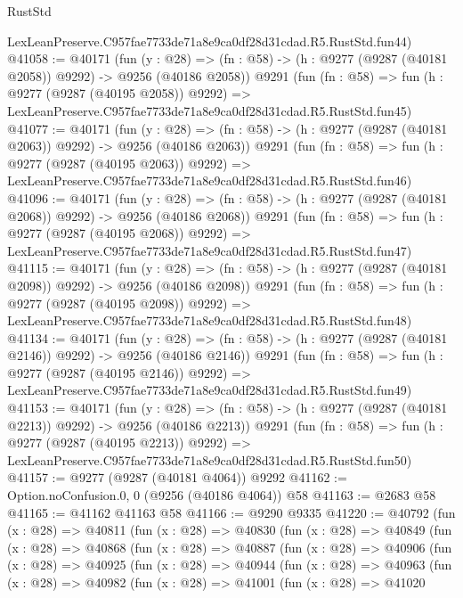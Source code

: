 \begin{lexlean}{RustStd}
\begin{coremodule}
    LexLeanPreserve.C957fae7733de71a8e9ca0df28d31cdad.R5.RustStd.fun44)
@41058 := @40171
    (fun (y : @28) =>
    (fn : @58) -> (h : @9277 (@9287 (@40181 @2058)) @9292) -> @9256 (@40186 @2058))
    @9291
    (fun (fn : @58) =>
    fun (h : @9277 (@9287 (@40195 @2058)) @9292) =>
    LexLeanPreserve.C957fae7733de71a8e9ca0df28d31cdad.R5.RustStd.fun45)
@41077 := @40171
    (fun (y : @28) =>
    (fn : @58) -> (h : @9277 (@9287 (@40181 @2063)) @9292) -> @9256 (@40186 @2063))
    @9291
    (fun (fn : @58) =>
    fun (h : @9277 (@9287 (@40195 @2063)) @9292) =>
    LexLeanPreserve.C957fae7733de71a8e9ca0df28d31cdad.R5.RustStd.fun46)
@41096 := @40171
    (fun (y : @28) =>
    (fn : @58) -> (h : @9277 (@9287 (@40181 @2068)) @9292) -> @9256 (@40186 @2068))
    @9291
    (fun (fn : @58) =>
    fun (h : @9277 (@9287 (@40195 @2068)) @9292) =>
    LexLeanPreserve.C957fae7733de71a8e9ca0df28d31cdad.R5.RustStd.fun47)
@41115 := @40171
    (fun (y : @28) =>
    (fn : @58) -> (h : @9277 (@9287 (@40181 @2098)) @9292) -> @9256 (@40186 @2098))
    @9291
    (fun (fn : @58) =>
    fun (h : @9277 (@9287 (@40195 @2098)) @9292) =>
    LexLeanPreserve.C957fae7733de71a8e9ca0df28d31cdad.R5.RustStd.fun48)
@41134 := @40171
    (fun (y : @28) =>
    (fn : @58) -> (h : @9277 (@9287 (@40181 @2146)) @9292) -> @9256 (@40186 @2146))
    @9291
    (fun (fn : @58) =>
    fun (h : @9277 (@9287 (@40195 @2146)) @9292) =>
    LexLeanPreserve.C957fae7733de71a8e9ca0df28d31cdad.R5.RustStd.fun49)
@41153 := @40171
    (fun (y : @28) =>
    (fn : @58) -> (h : @9277 (@9287 (@40181 @2213)) @9292) -> @9256 (@40186 @2213))
    @9291
    (fun (fn : @58) =>
    fun (h : @9277 (@9287 (@40195 @2213)) @9292) =>
    LexLeanPreserve.C957fae7733de71a8e9ca0df28d31cdad.R5.RustStd.fun50)
@41157 := @9277 (@9287 (@40181 @4064)) @9292
@41162 := Option.noConfusion.{0, 0} (@9256 (@40186 @4064)) @58
@41163 := @2683 @58
@41165 := @41162 @41163 @58
@41166 := @9290 @9335
@41220 := @40792
    (fun (x : @28) =>
    @40811
      (fun (x : @28) =>
      @40830
        (fun (x : @28) =>
        @40849
          (fun (x : @28) =>
          @40868
            (fun (x : @28) =>
            @40887
              (fun (x : @28) =>
              @40906
                (fun (x : @28) =>
                @40925
                  (fun (x : @28) =>
                  @40944
                    (fun (x : @28) =>
                    @40963
                      (fun (x : @28) =>
                      @40982
                        (fun (x : @28) =>
                        @41001
                          (fun (x : @28) =>
                          @41020

\end{coremodule}
\end{lexlean}

